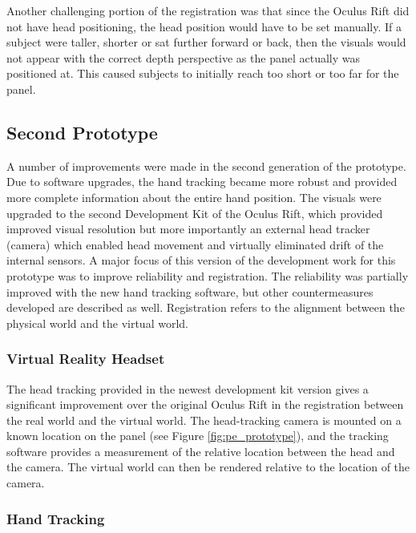 Another challenging portion of the registration was that since the Oculus Rift did not have head positioning, the head position would have to be set manually.
If a subject were taller, shorter or sat further forward or back, then the visuals would not appear with the correct depth perspective as the panel actually was positioned at.
This caused subjects to initially reach too short or too far for the panel.

\subsection{Second Prototype}

A number of improvements were made in the second generation of the prototype.
Due to software upgrades, the hand tracking became more robust and provided more complete information about the entire hand position.
The visuals were upgraded to the second Development Kit of the Oculus Rift, which provided improved visual resolution but more importantly an external head tracker (camera) which enabled head movement and virtually eliminated drift of the internal sensors.
A major focus of this version of the development work for this prototype was to improve reliability and registration.
The reliability was partially improved with the new hand tracking software, but other countermeasures developed are described as well.
Registration refers to the alignment between the physical world and the virtual world.

\subsubsection{Virtual Reality Headset}

The head tracking provided in the newest development kit version gives a significant improvement over the original Oculus Rift in the registration between the real world and the virtual world.
The head-tracking camera is mounted on a known location on the panel (see Figure \ref{fig:pe_prototype}), and the tracking software provides a measurement of the relative location between the head and the camera.
The virtual world can then be rendered relative to the location of the camera.

\subsubsection{Hand Tracking}

